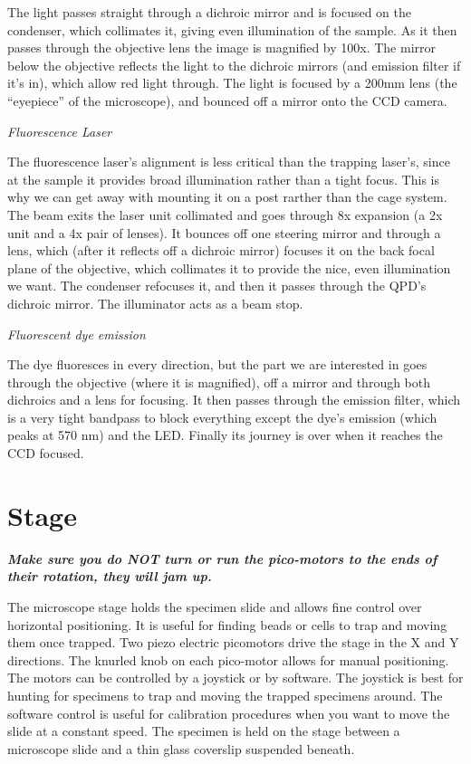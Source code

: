 \documentclass{../lab}
\begin{document}
The light passes straight through a dichroic mirror and is focused on the condenser, which collimates it, giving even illumination of the sample. As it then passes through the objective lens the image is magnified by 100x. The mirror below the objective reflects the light to the dichroic mirrors (and emission filter if it's in), which allow red light through. The light is focused by a 200mm lens (the ``eyepiece'' of the microscope), and bounced off a mirror onto the CCD camera.

\emph{Fluorescence Laser}

The fluorescence laser's alignment is less critical than the trapping laser's, since at the sample it provides broad illumination rather than a tight focus. This is why we can get away with mounting it on a post rarther than the cage system. The beam exits the laser unit collimated and goes through 8x expansion (a 2x unit and a 4x pair of lenses). It bounces off one steering mirror and through a lens, which (after it reflects off a dichroic mirror) focuses it on the back focal plane of the objective, which collimates it to provide the nice, even illumination we want. The condenser refocuses it, and then it passes through the QPD's dichroic mirror. The illuminator acts as a beam stop.

\emph{Fluorescent dye emission}

The dye fluoresces in every direction, but the part we are interested in goes through the objective (where it is magnified), off a mirror and through both dichroics and a lens for focusing. It then passes through the emission filter, which is a very tight bandpass to block everything except the dye's emission (which peaks at 570 nm) and the LED. Finally its journey is over when it reaches the CCD focused.

\section{Stage}

\emph{\textbf{Make sure you do NOT turn or run the pico-motors to the ends of their rotation, they will jam up.}}

The microscope stage holds the specimen slide and allows fine control over horizontal positioning. It is useful for finding beads or cells to trap and moving them once trapped. Two piezo electric picomotors drive the stage in the X and Y directions. The knurled knob on each pico-motor allows for manual positioning. The motors can be controlled by a joystick or by software. The joystick is best for hunting for specimens to trap and moving the trapped specimens around. The software control is useful for calibration procedures when you want to move the slide at a constant speed. The specimen is held on the stage between a microscope slide and a thin glass coverslip suspended beneath.
\end{document}
